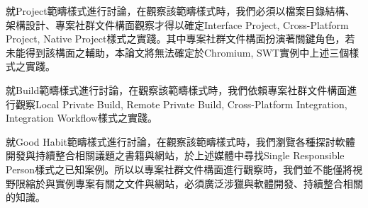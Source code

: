 就Project範疇樣式進行討論，在觀察該範疇樣式時，我們必須以檔案目錄結構、架構設計、專案社群文件構面觀察才得以確定Interface Project, Cross-Platform Project, Native Project樣式之實踐。其中專案社群文件構面扮演著關鍵角色，若未能得到該構面之輔助，本論文將無法確定於Chromium, SWT實例中上述三個樣式之實踐。

就Build範疇樣式進行討論，在觀察該範疇樣式時，我們依賴專案社群文件構面進行觀察Local Private Build, Remote Private Build, Cross-Platform Integration, Integration Workflow樣式之實踐。%

就Good Habit範疇樣式進行討論，在觀察該範疇樣式時，我們瀏覽各種探討軟體開發與持續整合相關議題之書籍與網站，於上述媒體中尋找Single Responsible Person樣式之已知案例。所以以專案社群文件構面進行觀察時，我們並不能僅將視野限縮於與實例專案有關之文件與網站，必須廣泛涉獵與軟體開發、持續整合相關的知識。